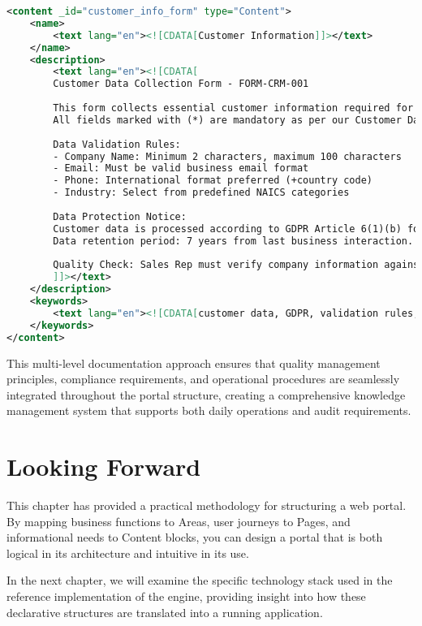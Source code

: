 \begin{lstlisting}[language=XML,caption={Content with Field-Level Documentation},label={lst:content-docs}]
<content _id="customer_info_form" type="Content">
    <name>
        <text lang="en"><![CDATA[Customer Information]]></text>
    </name>
    <description>
        <text lang="en"><![CDATA[
        Customer Data Collection Form - FORM-CRM-001
        
        This form collects essential customer information required for quote generation.
        All fields marked with (*) are mandatory as per our Customer Data Policy CDP-001.
        
        Data Validation Rules:
        - Company Name: Minimum 2 characters, maximum 100 characters
        - Email: Must be valid business email format
        - Phone: International format preferred (+country code)
        - Industry: Select from predefined NAICS categories
        
        Data Protection Notice: 
        Customer data is processed according to GDPR Article 6(1)(b) for contract performance.
        Data retention period: 7 years from last business interaction.
        
        Quality Check: Sales Rep must verify company information against D&B database.
        ]]></text>
    </description>
    <keywords>
        <text lang="en"><![CDATA[customer data, GDPR, validation rules, data quality, mandatory fields, retention policy]]></text>
    </keywords>
</content>
\end{lstlisting}

This multi-level documentation approach ensures that quality management principles, compliance requirements, and operational procedures are seamlessly integrated throughout the portal structure, creating a comprehensive knowledge management system that supports both daily operations and audit requirements.

\section{Looking Forward}
\label{sec:portal-structure-forward}

This chapter has provided a practical methodology for structuring a web portal. By mapping business functions to Areas, user journeys to Pages, and informational needs to Content blocks, you can design a portal that is both logical in its architecture and intuitive in its use.

In the next chapter, we will examine the specific technology stack used in the reference implementation of the \webspinner{} engine, providing insight into how these declarative structures are translated into a running application.
